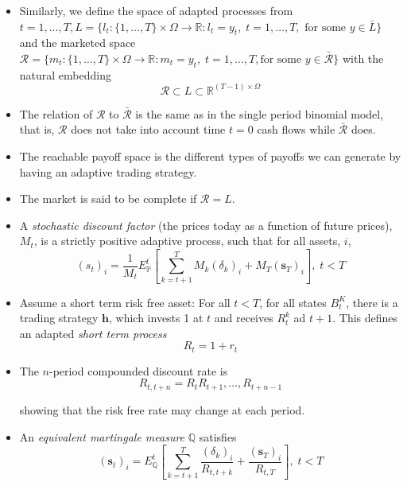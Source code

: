 \documentclass[11pt]{article}
\begin{document}
\begin{itemize}
    \item Similarly, we define the space of adapted processes from $t=1, \ldots, T, L = \{l_t :
    \{1, \ldots, T\} \times \Omega \rightarrow \mathbb{R} : l_t = y_t, \; t = 1, \ldots, T, 
    \text{ for some } y \in \bar{L}\}$ and the marketed space $\mathcal{R} = \{m_t : \{1, 
    \ldots, T\} \times \Omega \rightarrow \mathbb{R} : m_t = y_t, \; t = 1, \ldots, T, \text{
    for some } y \in \mathcal{\bar{R}}\}$ with the natural embedding 
    \[\mathcal{R} \subset L \subset \mathbb{R}^{(T-1) \times \Omega}\]
    
    \item The relation of $\mathcal{R}$ to $\mathcal{\bar{R}}$ is the same as in the single 
    period binomial model, that is, $\mathcal{R}$ does not take into account time $t=0$ cash 
    flows while $\mathcal{\bar{R}}$ does. 

    \item The reachable payoff space is the different types of payoffs we can generate by 
    having an adaptive trading strategy. 

    \item The market is said to be complete if $\mathcal{R} = L$.
    
    \item A \textit{stochastic discount factor} (the prices today as a function of future 
    prices), $M_t$, is a strictly positive adaptive process, such that for all assets, $i$, 
    \[ 
    {(s_t)}_i = \frac{1}{M_t} E_{\mathbb{P}}^t \left[ \sum_{k=t+1}^{T} M_k {(\delta_k)}_i + 
    M_T {(\boldsymbol{s}_T)}_i\right], \; t < T \]
    
    \item Assume a short term risk free asset: For all $t<T$, for all states $B_t^K$, there is 
    a trading strategy $\boldsymbol{h}$, which invests 1 at $t$ and receives $R_t^k$ ad $t+1$. 
    This defines an adapted \textit{short term process}
    \[R_t = 1 + r_t\]

    \item The $n$-period compounded discount rate is 
    \[R_{t, t+n} = R_t R_{t+1} , \ldots, R_{t+n-1}\]

    showing that the risk free rate may change at each period. 
    
    \item An \textit{equivalent martingale measure} $\mathbb{Q}$ satisfies 
    \[
    {(\boldsymbol{s}_t)}_i = E_{\mathbb{Q}}^t \left[ \sum_{k=t+1}^{T} \frac{{(\delta_k)}_i}
    {R_{t,t+k}} + \frac{{(\boldsymbol{s}_T)}_i}{R_{t,T}}\right], \; t < T
    \]
\end{itemize}
\end{document}
